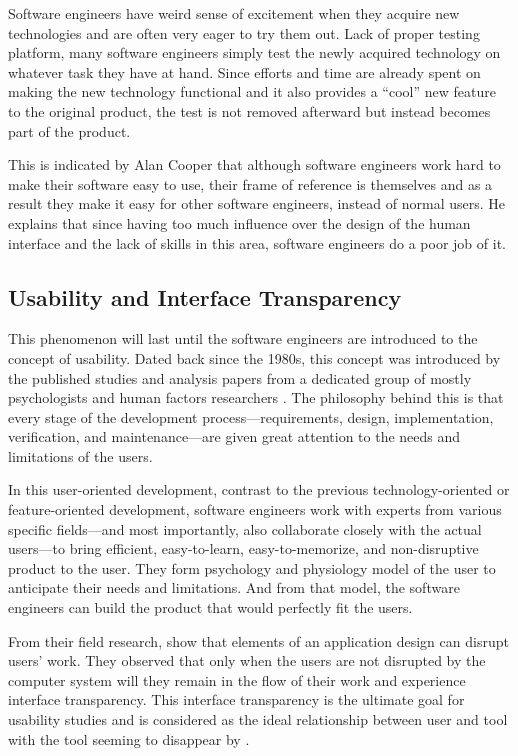 \documentclass{acm_proc_article-sp}
\begin{document}
Software engineers have weird sense of excitement when they acquire
new technologies and are often very eager to try them out. Lack of
proper testing platform, many software engineers simply test the newly
acquired technology on whatever task they have at hand. Since efforts
and time are already spent on making the new technology functional and
it also provides a ``cool'' new feature to the original product, the
test is not removed afterward but instead becomes part of the product.

This is indicated by Alan Cooper \citeyearpar{inmates:cooper} that
although software engineers work hard to make their software easy to
use, their frame of reference is themselves and as a result they make
it easy for other software engineers, instead of normal users. He
explains that since having too much influence over the design of the
human interface and the lack of skills in this area, software
engineers do a poor job of it.

\subsection{Usability and Interface Transparency}
This phenomenon will last until the software engineers are introduced
to the concept of usability. Dated back since the 1980s, this concept
was introduced by the published studies and analysis papers from a
dedicated group of mostly psychologists and human factors researchers
\citep{human:rubinstein, friendly:simpson, human:shneiderman,
  human:brown, software:dumas}. The philosophy behind this is that
every stage of the development process---requirements, design,
implementation, verification, and maintenance---are given great
attention to the needs and limitations of the users.

In this user-oriented development, contrast to the previous
technology-oriented or feature-oriented development, software
engineers work with experts from various specific fields---and most
importantly, also collaborate closely with the actual users---to bring
efficient, easy-to-learn, easy-to-memorize, and non-disruptive product
to the user. They form psychology and physiology model of the user to
anticipate their needs and limitations. And from that model, the
software engineers can build the product that would perfectly fit the
users.

From their field research, \citet{transparency:holtzblatt} show that
elements of an application design can disrupt users' work. They
observed that only when the users are not disrupted by the computer
system will they remain in the flow of their work and experience
interface transparency. This interface transparency is the ultimate
goal for usability studies and is considered as the ideal relationship
between user and tool with the tool seeming to disappear by
\citet{transparency:rutkoski}.
\end{document}
